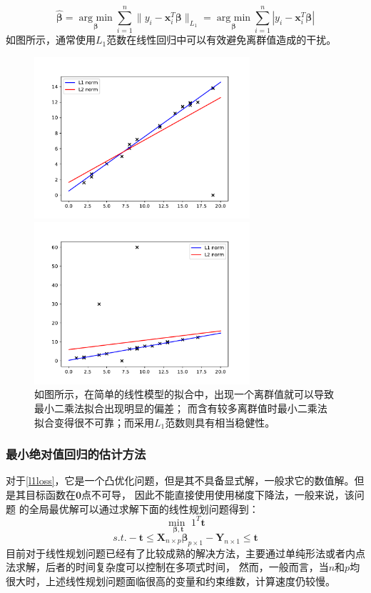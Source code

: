 \begin{equation}\label{l1loss}
\hat{\bm{\beta}} = \underset{\bm{\beta}}{\operatorname{arg\ min}} \sum_{i=1}^n\|y_i - \bm{x}^T_i\bm{\beta}\|_{L_1}
=\underset{\bm{\beta}}{\operatorname{arg\ min}} \sum_{i=1}^n|y_i - \bm{x}^T_i\bm{\beta}|
\end{equation}
如图所示，通常使用$L_1$范数在线性回归中可以有效避免离群值造成的干扰。
\begin{figure}[H]
    \centering
    \begin{minipage}[t]{0.48\textwidth}
    \includegraphics[width=8cm]{pics/l1-l2-diff2.pdf}
    \end{minipage}
    \begin{minipage}[t]{0.48\textwidth}
    \includegraphics[width=8cm]{pics/l1-l2-diff.pdf}
    \end{minipage}
    \caption{\small 如图所示，在简单的线性模型的拟合中，出现一个离群值就可以导致最小二乘法拟合出现明显的偏差；
    而含有较多离群值时最小二乘法拟合变得很不可靠；而采用$L_1$范数则具有相当稳健性。}
    \label{fig2.1}

\end{figure}

\subsubsection{最小绝对值回归的估计方法}
对于\eqref{l1loss}，它是一个凸优化问题，但是其不具备显式解，一般求它的数值解。但是其目标函数在$\bm{0}$点不可导，
因此不能直接使用使用梯度下降法，一般来说，该问题
的全局最优解可以通过求解下面的线性规划问题得到：
$$
    \underset{\bm{\beta}, \bm{t}}{\operatorname{min\ }} 1^T \bm{t}
$$
$$
    s.t. -\bm{t} \leq \bm{X}_{n\times p}\bm{\beta}_{p\times1} - \bm{Y}_{n\times 1} \leq \bm{t}
$$
目前对于线性规划问题已经有了比较成熟的解决方法，主要通过单纯形法或者内点法求解，后者的时间复杂度可以控制在多项式时间，
然而，一般而言，当$n$和$p$均很大时，上述线性规划问题面临很高的变量和约束维数，计算速度仍较慢。

